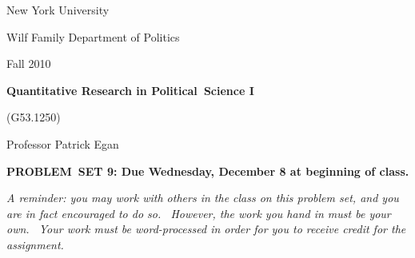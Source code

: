 \documentclass[11pt]{article}
\begin{document}
New York University

Wilf Family Department of Politics

Fall 2010

\begin{center}
{\large \textbf{Quantitative Research in Political\ Science I}}

(G53.1250)

Professor Patrick Egan

\bigskip

\textbf{PROBLEM\ SET 9: Due Wednesday, December 8 at beginning of class.}
\end{center}

\textit{A reminder: you may work with others in the class on this problem
set, and you are in fact encouraged to do so. \ However, the work you hand
in must be your own. \ Your work must be word-processed in order for you to
receive credit for the assignment.}
\end{document}

